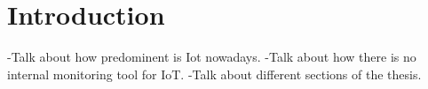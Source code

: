 \section{Introduction}

-Talk about how predominent is Iot nowadays.
-Talk about how there is no internal monitoring tool for IoT.
-Talk about different sections of the thesis.
